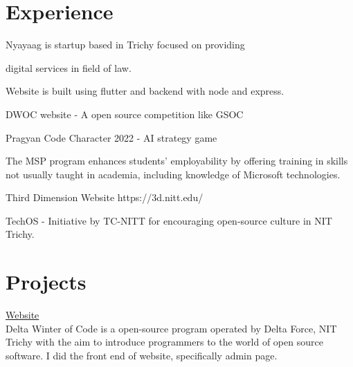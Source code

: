 \documentclass[]{deedy-resume-openfont}
\begin{document}
\hfill
\begin{minipage}[t]{0.69\textwidth} 

%
%
\section{Experience}
\hfill {}
\begin{tightemize}
    \item Nyayaag is startup based in Trichy focused on providing 
    
    digital services in field of law.
	\item Website is built using flutter and backend with node and express.
\end{tightemize}
\hfill {}
\begin{tightemize}
	\item DWOC website - A open source competition like GSOC
	\item Pragyan Code Character 2022 - AI strategy game
\end{tightemize}
\hfill {}
\begin{tightemize}
	\item The MSP program enhances students' employability by offering training in skills not usually taught in academia, including knowledge of Microsoft technologies.
\end{tightemize}
\hfill {}
\begin{tightemize}
	\item Third Dimension Website https://3d.nitt.edu/
	\item TechOS - Initiative by TC-NITT for encouraging open-source culture in NIT Trichy.
\end{tightemize}
\sectionsep
%
%
\section{Projects}
\raggedright

\hfill \href{http://dwoc.io}{Website}\\
Delta Winter of Code is a open-source program operated by Delta Force, NIT Trichy with the aim to introduce programmers to the world of open source software.
I did the front end of website, specifically admin page.\\
\sectionsep


\end{minipage}
\end{document}
